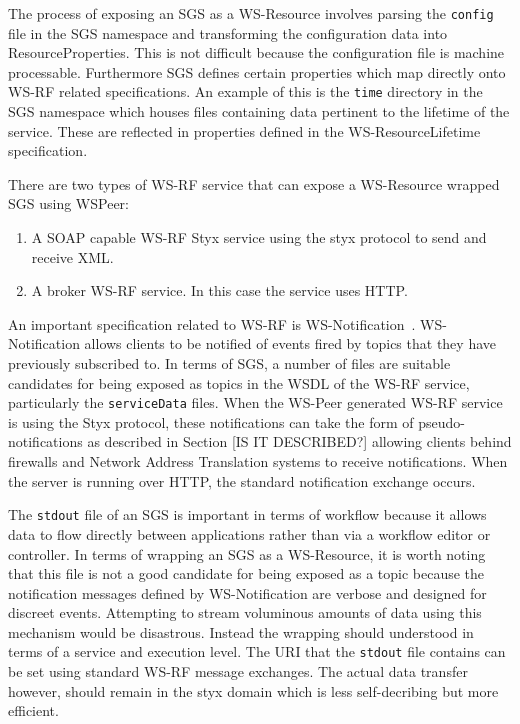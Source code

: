 \documentclass{llncs}
\begin{document}
The process of exposing an SGS as a WS-Resource involves parsing the \texttt{config} file in the SGS namespace and transforming the configuration data into ResourceProperties. This is not difficult because the configuration file is machine processable. Furthermore SGS defines certain properties which map directly onto WS-RF related specifications. An example of this is the \texttt{time} directory in the SGS namespace which houses files containing data pertinent to the lifetime of the service. These are reflected in properties defined in the WS-ResourceLifetime~\cite{wsrf-lifetime} specification.

There are two types of WS-RF service that can expose a WS-Resource wrapped SGS using WSPeer:

\begin{enumerate}
\item A SOAP capable WS-RF Styx service using the styx protocol to send and receive XML.
\item A broker WS-RF service. In this case the service uses HTTP.
\end{enumerate}

An important specification related to WS-RF is WS-Notification~\cite{wsrf-notification}. WS-Notification allows clients to be notified of events fired by topics that they have previously subscribed to. In terms of SGS, a number of files are suitable candidates for being exposed as topics in the WSDL of the WS-RF service, particularly the \texttt{serviceData} files. When the WS-Peer generated WS-RF service is using the Styx protocol, these notifications can take the form of pseudo-notifications as described in Section [IS IT DESCRIBED?] allowing clients behind firewalls and Network Address Translation systems to receive notifications. When the server is running over HTTP, the standard notification exchange occurs.

The \texttt{stdout} file of an SGS is important in terms of workflow because it allows data to flow directly between applications rather than via a workflow editor or controller. In terms of wrapping an SGS as a WS-Resource, it is worth noting that this file is not a good candidate for being exposed as a topic  because the notification messages defined by WS-Notification are verbose and designed for discreet events. Attempting to stream voluminous amounts of data using this mechanism would be disastrous. Instead the wrapping should understood in terms of a service and execution level. The URI that the \texttt{stdout} file contains can be set using standard WS-RF message exchanges. The actual data transfer however, should remain in the styx domain which is less self-decribing but more efficient.
\end{document}
